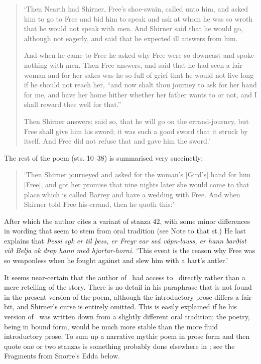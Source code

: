 \begin{quote}{\small ‘Then Nearth had Shirner, Free’s shoe-swain, called unto him, and asked him to go to Free and bid him to speak and ask at whom he was so wroth that he would not speak with men.  And Shirner said that he would go, although not eagerly, and said that he expected ill answers from him.

And when he came to Free he asked why Free were so downcast and spoke nothing with men.  Then Free answers, and said that he had seen a fair woman and for her sakes was he so full of grief that he would not live long if he should not reach her, “and now shalt thou journey to ask for her hand for me, and have her home hither whether her father wants to or not, and I shall reward thee well for that.”

Then Shirner answers; said so, that he will go on the errand-journey, but Free shall give him his sword; it was such a good sword that it struck by itself.  And Free did not refuse that and gave him the sword.’}\end{quote}

The rest of the poem (sts. 10–38) is summarised very succinctly:

\begin{quote}{\small ‘Then Shirner journeyed and asked for the woman’s [Gird’s] hand for him [Free], and got her promise that nine nights later she would come to that place which is called Barrey and have a wedding with Free.  And when Shirner told Free his errand, then he quoth this:’}\end{quote}

After which the author cites a variant of stanza 42, with some minor differences in wording that seem to stem from oral tradition (see Note to that st.)  He last explains that \emph{Þessi sǫk er til þess, er Freyr var svá vápn-lauss, er hann barðist við Belja ok drap hann með hjartar-horni.} ‘This event is the reason why Free was so weaponless when he fought against  and slew him with a hart’s antler.’

It seems near-certain that the author of \Gylfaginning\ had access to \Skirnismal\ directly rather than a mere retelling of the story.  There is no detail in his paraphrase that is not found in the present version of the poem, although the introductory prose differs a fair bit, and Shirner’s curse is entirely omitted.  This is easily explained if he his version of \Skirnismal\ was written down from a slightly different oral tradition; the poetry, being in bound form, would be much more stable than the more fluid introductory prose.  To sum up a narrative mythic poem in prose form and then quote one or two stanzas is something probably done elsewhere in \Gylfaginning; see the Fragments from Snorre’s Edda below.

